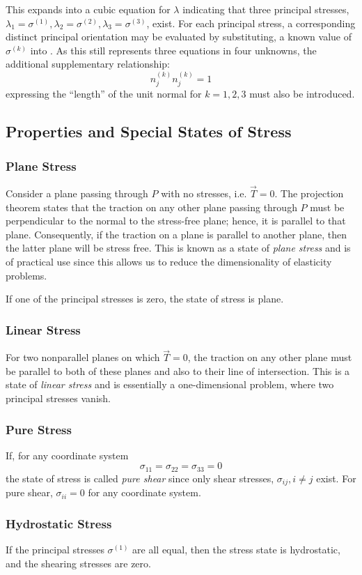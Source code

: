 This expands into a cubic equation for $\lambda$ indicating that three principal stresses, $\lambda_1 = \sigma^{(1)}, \lambda_2 = \sigma^{(2)}, \lambda_3 = \sigma^{(3)}$, exist.
For each principal stress, a corresponding distinct principal orientation may be evaluated by substituting, a known value of $\sigma^{(k)}$ into .
As this still represents three equations in four unknowns, the additional supplementary relationship:
\begin{equation*}
  n_j^{(k)} n_j^{(k)} = 1
\end{equation*}
expressing the ``length'' of the unit normal for $k = 1,2,3$ must also be introduced. 


\subsection{Properties and Special States of Stress}

\subsubsection{Plane Stress}
Consider a plane passing through $P$ with no stresses, i.e. $\Vec{T} = 0$.
The projection theorem states that the traction on any other plane passing through $P$ must be perpendicular to the normal to the stress-free plane; hence, it is parallel to that plane.
Consequently, if the traction on a plane is parallel to another plane, then the latter plane will be stress free.
This is known as a state of \textit{plane stress} and is of practical use since this allows us to reduce the dimensionality of elasticity problems.

If one of the principal stresses is zero, the state of stress is plane.

\subsubsection{Linear Stress}
For two nonparallel planes on which $\Vec{T} = 0$, the traction on any other plane must be parallel to both of these planes and also to their line of intersection.
This is a state of \textit{linear stress} and is essentially a one-dimensional problem, where two principal stresses vanish.

\subsubsection{Pure Stress}
If, for any coordinate system
\begin{equation*}
  \sigma_{11} = \sigma_{22} = \sigma_{33} = 0
\end{equation*}
the state of stress is called \textit{pure shear} since only shear stresses, $\sigma_{ij}, i \neq j$ exist.
For pure shear, $\sigma_{ii} = 0$ for any coordinate system.

\subsubsection{Hydrostatic Stress}
If the principal stresses $\sigma^{(1)}$ are all equal, then the stress state is hydrostatic, and the shearing stresses are zero.
